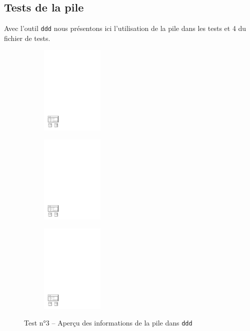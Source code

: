 \subsection{Tests de la pile}
	Avec l'outil \texttt{ddd} nous présentons ici l'utilisation de la pile dans les tests  et 4 du fichier de tests. 
	\begin{figure}[H]
		\begin{subfigure}[c]{0.33\textwidth}
			\centering
	  	\includegraphics[width=3cm,clip=true,trim=1cm 1cm 15cm 24cm]{../tests/ddd_graph/ddd_3_0}
		\end{subfigure}
		\begin{subfigure}[c]{0.33\textwidth}
			\centering
			\includegraphics[width=3cm,clip=true,trim=1cm 1cm 15cm 24cm]{../tests/ddd_graph/ddd_3_1}
		\end{subfigure}
		\begin{subfigure}[c]{0.33\textwidth}
			\centering
	  	\includegraphics[width=3cm,clip=true,trim=1cm 1cm 15cm 24cm]{../tests/ddd_graph/ddd_3_2}
		\end{subfigure}
	  \caption{Test n°3 -- Aperçu des informations de la pile dans \texttt{ddd}}
	\end{figure}
